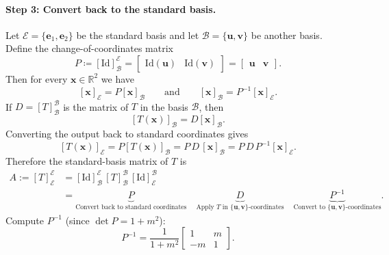 \documentclass[11pt,openany]{article}
\begin{document}
\paragraph{Step 3: Convert back to the standard basis.}
Let $\mathcal E=\{\textbf{e}_1,\textbf{e}_2\}$ be the standard basis and let $\mathcal B=\{\textbf{u},\textbf{v}\}$ be another basis.
Define the change-of-coordinates matrix
\[
P \coloneqq [\mathrm{Id}]_{\mathcal B}^{\mathcal E}=
\begin{bmatrix}\mathrm{Id}(\textbf{u}) & \mathrm{Id}(\textbf{v})\end{bmatrix}=
\begin{bmatrix}\textbf{u} & \textbf{v}\end{bmatrix}.
\]
Then for every $\textbf{x}\in\mathbb R^2$ we have
\[
[\textbf{x}]_{\mathcal E}=P[\textbf{x}]_{\mathcal B}
\qquad\text{and}\qquad
[\textbf{x}]_{\mathcal B}=P^{-1}[\textbf{x}]_{\mathcal E}.
\] 
If $D=[T]_{\mathcal B}^{\mathcal B}$ is the matrix of $T$ in the basis $\mathcal B$, then
\[
[T(\textbf{x})]_{\mathcal B}=D[\textbf{x}]_{\mathcal B}.
\]
Converting the output back to standard coordinates gives
\[
[T(\textbf{x})]_{\mathcal E}
= P[T(\textbf{x})]_{\mathcal B}
= P\,D\,[\textbf{x}]_{\mathcal B}
= P\,D\,P^{-1}[\textbf{x}]_{\mathcal E}.
\]
Therefore the standard-basis matrix of $T$ is
\begin{align*}
A:=[T]_{\mathcal E}^{\mathcal E}
&=[\mathrm{Id}]_{\mathcal B}^{\mathcal E}\,[T]_{\mathcal B}^{\mathcal B}\,[\mathrm{Id}]_{\mathcal E}^{\mathcal B} \\
&=	\underbrace{P}_{\text{Convert back to standard coordinates}}\quad \underbrace{D}_{\text{Apply $T$ in $\{\textbf{u},\textbf{v}\}$-coordinates}}\quad\underbrace{P^{-1}}_{\text{Convert to $\{\textbf{u},\textbf{v}\}$-coordinates}}
.
\end{align*}
Compute $P^{-1}$ (since $\det P = 1+m^2$): \[
P^{-1}=\frac{1}{1+m^2}
\begin{bmatrix}
	1 & m\\
	-m & 1
\end{bmatrix}.\] 
\end{document}
